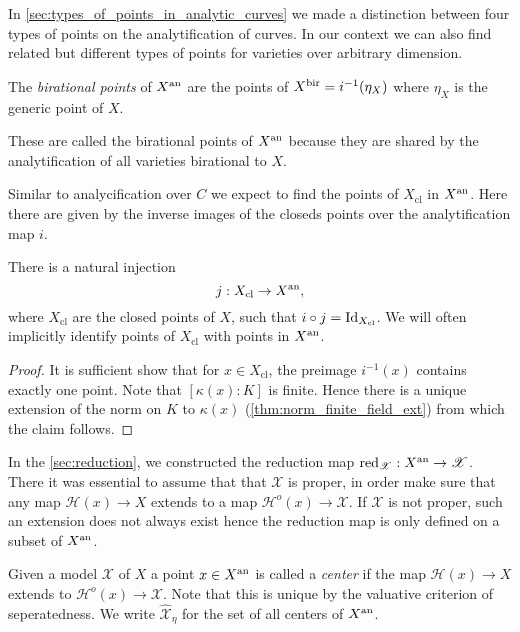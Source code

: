 In \cref{sec:types_of_points_in_analytic_curves} we made a distinction between four types of points on the analytification of curves. 
In our context we can also find related but different types of points for varieties over arbitrary dimension. 

\begin{definition}
	The \emph{birational points} of $X{}^{\text{an}}$ are the points of $X{}^{\text{bir}} = i ^{-1}(\eta_X)$ where $\eta_X$ is the generic point of $X$. 
\end{definition}
These are called the birational points of $X{}^{\text{an}}$ because they are shared by the analytification of all varieties birational to $X$.

Similar to analycification over $C$ we expect to find the points of $X_\text{cl}$ in $X{}^{\text{an}}$.
Here there are given by the inverse images of the closeds points over the analytification map $i$. 
\begin{lemma}
	There is a natural injection \[
		j: X_\text{cl}  \to X{}^{\text{an}} 
	,\] 
	where $X_\text{cl} $ are the closed points of $X$, such that $i \circ j = \operatorname{Id} _{X_\text{cl} }$. 
	We will often implicitly identify points of $X_\text{cl} $ with points in $X{}^{\text{an}}$. 
\end{lemma}
\begin{proof}
	It is sufficient show that for $x \in X_\text{cl} $, the preimage $i^{-1}(x)$ contains exactly one point. 
	Note that $[\kappa(x):K]$ is finite. 
	Hence there is a unique extension of the norm on $K$ to $\kappa(x)$ (\cref{thm:norm_finite_field_ext}) from which the claim follows. 
\end{proof}

In the \cref{sec:reduction}, we constructed the reduction map $\operatorname{red}_{\mathscr X}: X{}^{\text{an}} \to \mathscr X$. 
There it was essential to assume that that $\mathscr X$ is proper, in order make sure that any map $\mathcal{H} (x) \to X$ extends to a map $\mathcal{H} ^{o}(x) \to \mathscr X$. 
If $\mathscr X$ is not proper, such an extension does not always exist hence the reduction map is only defined on a subset of $X{}^{\text{an}}$. 
\begin{definition}
	Given a model $\mathscr X$ of $X$ a point $x \in X{}^{\text{an}} $ is called a \emph{center} if the map $\mathcal{H} (x) \to X$ extends to $\mathcal{H}^{o} (x) \to \mathscr X$. 
	Note that this is unique by the valuative criterion of seperatedness. 
	We write $\widehat{\mathscr X}_\eta$ for the set of all centers of $X{}^{\text{an}}$. 
\end{definition}

